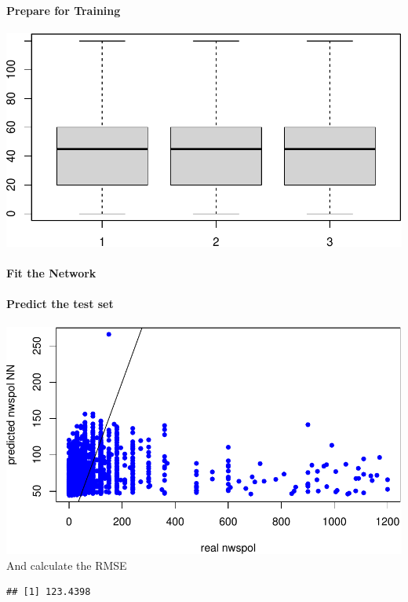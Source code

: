 \documentclass[
]{article}
\begin{document}
\hypertarget{prepare-for-training}{%
\paragraph{Prepare for Training}\label{prepare-for-training}}

\includegraphics{ESS_DE_files/figure-latex/preparation-1.pdf}

\hypertarget{fit-the-network}{%
\paragraph{Fit the Network}\label{fit-the-network}}

\hypertarget{predict-the-test-set}{%
\paragraph{Predict the test set}\label{predict-the-test-set}}

\includegraphics{ESS_DE_files/figure-latex/plot comparsion of real and predicated data-1.pdf}
And calculate the RMSE

\begin{verbatim}
## [1] 123.4398
\end{verbatim}
\end{document}
